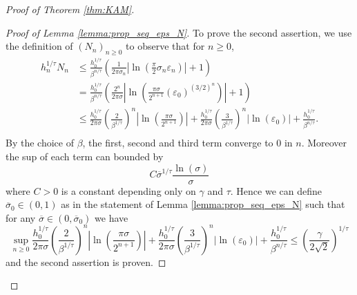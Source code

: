 \documentclass[10pt,a4paper]{amsart}
\begin{document}
\begin{proof}[Proof of Theorem \ref{thm:KAM}]
\begin{proof}[Proof of Lemma \ref{lemma:prop_seq_eps_N}]
To prove the second assertion, we use the definition of $(N_n)_{n\geq 0}$ to observe that for $n\geq 0$,
\begin{align*}
    h_n^{1/\tau}N_n
    & \leq 
    \frac{h_0^{1/\tau}}{\beta^{n/\tau}}
    \left(
    \frac{1}{2\pi\sigma_n}
    \left|
    \ln\left(
    \frac{\pi}{2}\sigma_n \varepsilon_n
    \right)
    \right|
    +1
    \right)\\
    & =
    \frac{h_0^{1/\tau}}{\beta^{n/\tau}}
    \left(
    \frac{2^n}{2\pi\sigma}
    \left|
    \ln\left(
    \frac{\pi\sigma}{2^{n+1}}(\varepsilon_0)^{(3/2)^n}
    \right)
    \right|
    +1
    \right)\\
    & \leq
    \frac{h_0^{1/\tau}}{2\pi\sigma}
    \left(
    \frac{2}{\beta^{1/\tau}}
    \right)^n
    \left|
    \ln\left(
    \frac{\pi\sigma}{2^{n+1}}
    \right)
    \right|
    +
    \frac{h_0^{1/\tau}}{2\pi\sigma}
    \left(
    \frac{3}{\beta^{1/\tau}}
    \right)^n
    \left|
    \ln\left(
    \varepsilon_0
    \right)
    \right|
    +
    \frac{h_0^{1/\tau}}{\beta^{n/\tau}}.
    \\
\end{align*}
By the choice of $\beta$, the first, second and third term converge to $0$ in $n$. 
Moreover the sup of each term can bounded by 
\[
C\overline\sigma^{1/\tau}\frac{\ln(\sigma)}{\sigma}
\]
where $C>0$ is a constant depending only on $\gamma$ and $\tau$.
Hence we can define $\overline\sigma_0\in(0,1)$ as in the statement of Lemma \ref{lemma:prop_seq_eps_N} such that for any $\overline\sigma\in(0,\overline\sigma_0)$ we have
\[
\sup_{n\geq 0} 
    \frac{h_0^{1/\tau}}{2\pi\sigma}
    \left(
    \frac{2}{\beta^{1/\tau}}
    \right)^n
    \left|
    \ln\left(
    \frac{\pi\sigma}{2^{n+1}}
    \right)
    \right|
    +
    \frac{h_0^{1/\tau}}{2\pi\sigma}
    \left(
    \frac{3}{\beta^{1/\tau}}
    \right)^n
    \left|
    \ln\left(
    \varepsilon_0
    \right)
    \right|
    +
    \frac{h_0^{1/\tau}}{\beta^{n/\tau}}
    \leq
    \left(\frac{\gamma}{2\sqrt 2}\right)^{1/\tau}
\]
and the second assertion is proven.


\end{proof}
\end{proof}
\end{document}
